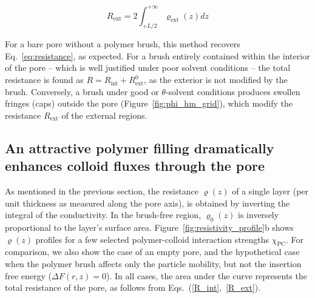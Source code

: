 \documentclass[12pt, a4paper]{article}
\begin{document}
\begin{equation}
   R_{\text{ext}} =2\int_{+L/2}^{+\infty}\varrho_{\text{ext}}(z)dz
    \label{R_ext}
\end{equation}

For a bare pore without a polymer brush, this method recovers Eq.~\ref{eq:resistance}, as expected.
For a brush entirely contained within the interior of the pore -- which is well justified under poor solvent conditions -- the total resistance is found as $R = R_{\text{int}} + R_{\text{ext}}^{0}$, as the exterior is not modified by the brush.
Conversely, a brush under good or $\theta$-solvent conditions produces swollen fringes (caps) outside the pore (Figure~\ref{fig:phi_hm_grid}), which modify the resistance $R_{\text{ext}}$ of the external regions.


\subsection{An attractive polymer filling dramatically enhances colloid fluxes through the pore}

As mentioned in the previous section, the resistance $\varrho(z)$ of a single layer (per unit thickness as measured along the pore axis), is obtained by inverting the integral of the conductivity.
In the brush-free region, $\varrho_{0}(z)$ is inversely proportional to the layer's surface area.
Figure~\ref{fig:resistivity_profile}b shows $\varrho(z)$ profiles for a few selected polymer-colloid interaction strengths $\chi_{\text{PC}}$.
For comparison, we also show the case of an empty pore, and the hypothetical case when the polymer brush affects only the particle mobility, but not the insertion free energy ($\Delta F(r,z) = 0$).
In all cases, the area under the curve represents the total resistance of the pore, as follows from Eqs.~(\ref{R_int},~\ref{R_ext}).
\end{document}
